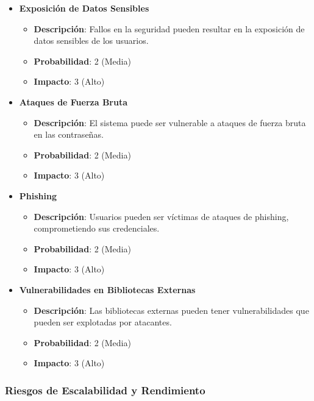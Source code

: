 \documentclass{article}
\begin{document}
\begin{itemize}
    \item \textbf{Exposición de Datos Sensibles}
          \begin{itemize}
              \item \textbf{Descripción}: Fallos en la seguridad pueden resultar en la exposición de datos sensibles de los usuarios.
              \item \textbf{Probabilidad}: 2 (Media)
              \item \textbf{Impacto}: 3 (Alto)
          \end{itemize}

    \item \textbf{Ataques de Fuerza Bruta}
          \begin{itemize}
              \item \textbf{Descripción}: El sistema puede ser vulnerable a ataques de fuerza bruta en las contraseñas.
              \item \textbf{Probabilidad}: 2 (Media)
              \item \textbf{Impacto}: 3 (Alto)
          \end{itemize}

    \item \textbf{Phishing}
          \begin{itemize}
              \item \textbf{Descripción}: Usuarios pueden ser víctimas de ataques de phishing, comprometiendo sus credenciales.
              \item \textbf{Probabilidad}: 2 (Media)
              \item \textbf{Impacto}: 3 (Alto)
          \end{itemize}

    \item \textbf{Vulnerabilidades en Bibliotecas Externas}
          \begin{itemize}
              \item \textbf{Descripción}: Las bibliotecas externas pueden tener vulnerabilidades que pueden ser explotadas por atacantes.
              \item \textbf{Probabilidad}: 2 (Media)
              \item \textbf{Impacto}: 3 (Alto)
          \end{itemize}
\end{itemize}

\subsubsection{Riesgos de Escalabilidad y Rendimiento}
\end{document}
